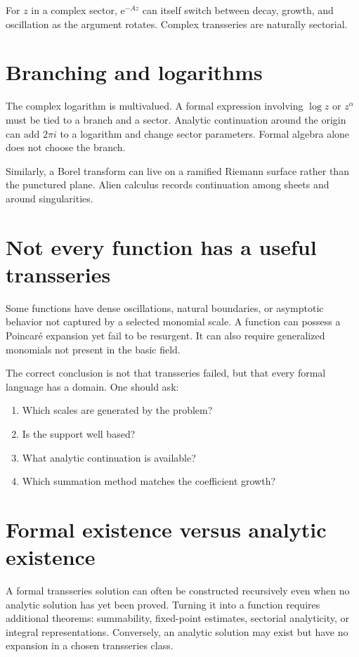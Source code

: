 \documentclass[11pt,oneside]{book}
\theoremstyle{definition}
\theoremstyle{remark}
\newcommand{\e}{\mathrm{e}}
\begin{document}
For $z$ in a complex sector, $\e^{-Az}$ can itself switch between decay, growth,
and oscillation as the argument rotates. Complex transseries are naturally
sectorial.

\section{Branching and logarithms}

The complex logarithm is multivalued. A formal expression involving $\log z$
or $z^\alpha$ must be tied to a branch and a sector. Analytic continuation around
the origin can add $2\pi i$ to a logarithm and change sector parameters. Formal
algebra alone does not choose the branch.

Similarly, a Borel transform can live on a ramified Riemann surface rather than
the punctured plane. Alien calculus records continuation among sheets and around
singularities.

\section{Not every function has a useful transseries}

Some functions have dense oscillations, natural boundaries, or asymptotic
behavior not captured by a selected monomial scale. A function can possess a
Poincar\'e expansion yet fail to be resurgent. It can also require generalized
monomials not present in the basic field.

The correct conclusion is not that transseries failed, but that every formal
language has a domain. One should ask:
\begin{enumerate}
\item Which scales are generated by the problem?
\item Is the support well based?
\item What analytic continuation is available?
\item Which summation method matches the coefficient growth?
\end{enumerate}

\section{Formal existence versus analytic existence}

A formal transseries solution can often be constructed recursively even when no
analytic solution has yet been proved. Turning it into a function requires
additional theorems: summability, fixed-point estimates, sectorial analyticity,
or integral representations. Conversely, an analytic solution may exist but
have no expansion in a chosen transseries class.
\end{document}
